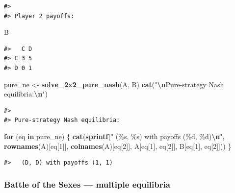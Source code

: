 \documentclass[
]{article}
\newenvironment{Shaded}{\begin{snugshade}}{\end{snugshade}}
\newcommand{\ControlFlowTok}[1]{\textcolor[rgb]{0.13,0.29,0.53}{\textbf{#1}}}
\newcommand{\DecValTok}[1]{\textcolor[rgb]{0.00,0.00,0.81}{#1}}
\newcommand{\FunctionTok}[1]{\textcolor[rgb]{0.13,0.29,0.53}{\textbf{#1}}}
\newcommand{\NormalTok}[1]{#1}
\newcommand{\OtherTok}[1]{\textcolor[rgb]{0.56,0.35,0.01}{#1}}
\newcommand{\SpecialCharTok}[1]{\textcolor[rgb]{0.81,0.36,0.00}{\textbf{#1}}}
\newcommand{\StringTok}[1]{\textcolor[rgb]{0.31,0.60,0.02}{#1}}
\begin{document}
\begin{verbatim}
#> 
#> Player 2 payoffs:
\end{verbatim}

\begin{Shaded}
\begin{Highlighting}[]
\NormalTok{B}
\end{Highlighting}
\end{Shaded}

\begin{verbatim}
#>   C D
#> C 3 5
#> D 0 1
\end{verbatim}

\begin{Shaded}
\begin{Highlighting}[]
\NormalTok{pure\_ne }\OtherTok{\textless{}{-}} \FunctionTok{solve\_2x2\_pure\_nash}\NormalTok{(A, B)}
\FunctionTok{cat}\NormalTok{(}\StringTok{"}\SpecialCharTok{\textbackslash{}n}\StringTok{Pure{-}strategy Nash equilibria:}\SpecialCharTok{\textbackslash{}n}\StringTok{"}\NormalTok{)}
\end{Highlighting}
\end{Shaded}

\begin{verbatim}
#> 
#> Pure-strategy Nash equilibria:
\end{verbatim}

\begin{Shaded}
\begin{Highlighting}[]
\ControlFlowTok{for}\NormalTok{ (eq }\ControlFlowTok{in}\NormalTok{ pure\_ne) \{}
  \FunctionTok{cat}\NormalTok{(}\FunctionTok{sprintf}\NormalTok{(}\StringTok{"  (\%s, \%s) with payoffs (\%d, \%d)}\SpecialCharTok{\textbackslash{}n}\StringTok{"}\NormalTok{,}
              \FunctionTok{rownames}\NormalTok{(A)[eq[}\DecValTok{1}\NormalTok{]], }\FunctionTok{colnames}\NormalTok{(A)[eq[}\DecValTok{2}\NormalTok{]],}
\NormalTok{              A[eq[}\DecValTok{1}\NormalTok{], eq[}\DecValTok{2}\NormalTok{]], B[eq[}\DecValTok{1}\NormalTok{], eq[}\DecValTok{2}\NormalTok{]]))}
\NormalTok{\}}
\end{Highlighting}
\end{Shaded}

\begin{verbatim}
#>   (D, D) with payoffs (1, 1)
\end{verbatim}

\subsubsection{Battle of the Sexes --- multiple
equilibria}\label{battle-of-the-sexes-multiple-equilibria}
\end{document}
